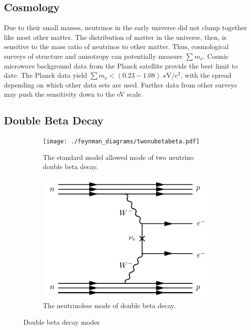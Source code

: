 \documentclass[herrin-thesis.tex]{subfiles}
\begin{document}
\subsection{Cosmology}
Due to their small masses, neutrinos in the early universe did not clump together like most other matter. The distribution of matter in the universe, then, is sensitive to the mass ratio of neutrinos to other matter. Thus, cosmological surveys of structure and anisotropy can potentially measure \(\sum m_{\nu}\). Cosmic microwave background data from the Planck satellite provide the best limit to date. The Planck data yield \(\sum m_{\nu} < (0.23 - 1.08) \text{ eV}/\text{c}^2\), with the spread depending on which other data sets are used\cite{Ade:2013kl}. Further data from other surveys may push the sensitivity down to the \si{\eV} scale\cite{Abazajian:2011tg}.

\subsection{Double Beta Decay}

\begin{figure}
	\centering
	\begin{subfigure}[b]{0.48\textwidth}
		\centering
		\texttt{[image: ./feynman\_diagrams/twonubetabeta.pdf]}
		\caption[Diagram of \(2\nu\beta\beta\)]{The standard model allowed mode of two neutrino double beta decay.}
		\label{fig:diagram_2nubb}
	\end{subfigure}\hfill%
         \begin{subfigure}[b]{0.48\textwidth}
		\centering
		\includegraphics[width=\textwidth]{./feynman_diagrams/zeronubetabeta.pdf}
		\caption[Diagram of \(0\nu\beta\beta\)]{The neutrinoless mode of double beta decay.}
		\label{fig:diagram_0nubb}
	\end{subfigure}
	\label{fig:diagrams}
	\caption[Double beta decay modes]{Double beta decay modes}
\end{figure}
\end{document}
